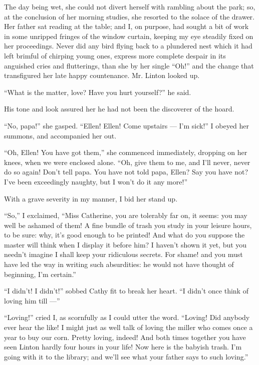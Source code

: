 \par The day being wet, she could not divert herself with rambling about the park; so, at the conclusion of her morning studies, she resorted to the solace of the drawer. Her father sat reading at the table; and I, on purpose, had sought a bit of work in some unripped fringes of the window curtain, keeping my eye steadily fixed on her proceedings. Never did any bird flying back to a plundered nest which it had left brimful of chirping young ones, express more complete despair in its anguished cries and flutterings, than she by her single “Oh!” and the change that transfigured her late happy countenance. Mr. Linton looked up.
\par “What is the matter, love? Have you hurt yourself?” he said.
\par His tone and look assured her he had not been the discoverer of the hoard.
\par “No, papa!” she gasped. “Ellen! Ellen! Come upstairs — I'm sick!” I obeyed her summons, and accompanied her out.
\par “Oh, Ellen! You have got them,” she commenced immediately, dropping on her knees, when we were enclosed alone. “Oh, give them to me, and I'll never, never do so again! Don't tell papa. You have not told papa, Ellen? Say you have not? I've been exceedingly naughty, but I won't do it any more!”
\par With a grave severity in my manner, I bid her stand up.
\par “So,” I exclaimed, “Miss Catherine, you are tolerably far on, it seems: you may well be ashamed of them! A fine bundle of trash you study in your leisure hours, to be sure: why, it's good enough to be printed! And what do you suppose the master will think when I display it before him? I haven't shown it yet, but you needn't imagine I shall keep your ridiculous secrets. For shame! and you must have led the way in writing such absurdities: he would not have thought of beginning, I'm certain.”
\par “I didn't! I didn't!” sobbed Cathy fit to break her heart. “I didn't once think of loving him till —”
\par “Loving!” cried I, as scornfully as I could utter the word. “Loving! Did anybody ever hear the like! I might just as well talk of loving the miller who comes once a year to buy our corn. Pretty loving, indeed! And both times together you have seen Linton hardly four hours in your life! Now here is the babyish trash. I'm going with it to the library; and we'll see what your father says to such loving.”
